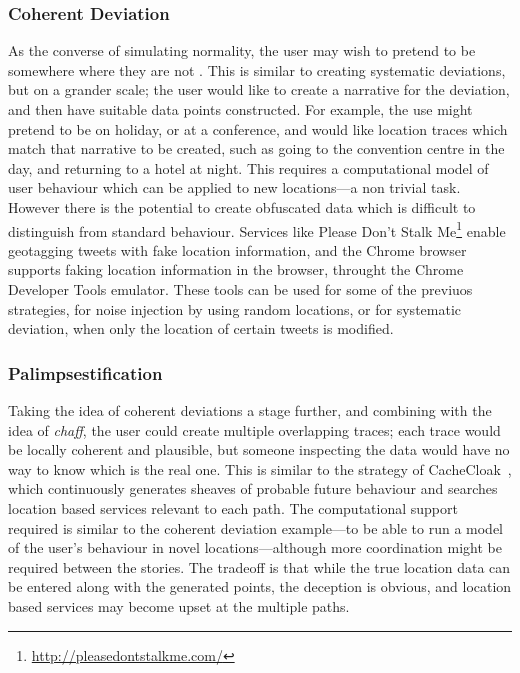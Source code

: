 \documentclass{IOS-Book-Article}     %
\newcommand{\tbox}[3][red]{{
\color{#1}\noindent{
   \fbox{\scriptsize{ {\bf #2} \textsl{#3}}}
   \vspace{2pt}
}
}}
\newcommand{\todo}[1]{\tbox{TODO:}{#1}}
\begin{document}
\subsubsection{Coherent Deviation}
As the converse of simulating normality, the user may wish to pretend to be
somewhere where they are not \todo{more motivation for Alibot!}. This is similar
to creating systematic deviations, but on a grander scale; the user would like
to create a narrative for the deviation, and then have suitable data points
constructed. For example, the use might pretend to be on holiday, or at a
conference, and would like location traces which match that narrative to be
created, such as going to the convention centre in the day, and returning to a
hotel at night. This requires a computational model of user behaviour which can
be applied to new locations---a non trivial task. However there is the potential
to create obfuscated data which is difficult to distinguish from standard
behaviour. Services like Please Don't Stalk 
Me\footnote{\url{http://pleasedontstalkme.com/}} enable geotagging tweets 
with fake location information, and the Chrome browser supports faking location 
information in the browser, throught the Chrome Developer Tools emulator. These 
tools can be used for some of the previuos strategies, for noise injection by 
using random locations, or for systematic deviation, when only the location of 
certain tweets is modified.

\subsubsection{Palimpsestification}
Taking the idea of coherent deviations a stage further, and combining with the
idea of \emph{chaff}, the user could create multiple overlapping traces; each
trace would be locally coherent and plausible, but someone inspecting the data would have no way to know which is the real one.
This is similar to the strategy of 
CacheCloak~\cite{Meyerowitz:2009:HSF:1614320.1614358}, which
continuously generates sheaves of probable future behaviour and searches
location based services relevant to each  path. The computational support
required is similar to the coherent deviation example---to be able to run a
model of the user's behaviour in novel locations---although more coordination
might be required between the stories. The tradeoff is that while the true
location data can be entered along with the generated points, the deception is
obvious, and location based services may become upset at the multiple paths.
\end{document}
